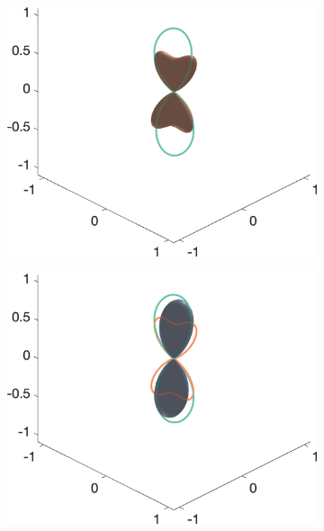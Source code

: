 \begin{figure}
{\begin{minipage}[c]{\textwidth}
\begin{subfigure}[]{0.245\textwidth}
  \end{subfigure}
  \begin{subfigure}[]{0.245\textwidth}
    \includegraphics[width=\textwidth]{figures/frf_experiment/EMfibres_fod_3D_b_3000n_2}
  \end{subfigure}
  \begin{subfigure}[]{0.245\textwidth}
    \includegraphics[width=\textwidth]{figures/frf_experiment/EMfibres_fod_3D_b_3000n_3}
  \end{subfigure}
  \begin{subfigure}[]{0.245\textwidth}

\end{subfigure}
\end{minipage}}
\end{figure}
